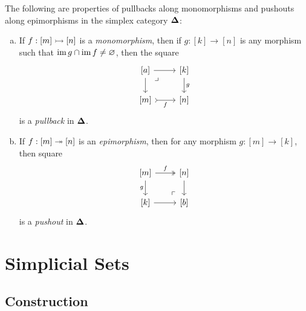 \begin{lemma}
\label{lem:splx-cat-pullback-mono-pushout-epi}
The following are properties of pullbacks along monomorphisms and pushouts along
epimorphisms in the simplex category \({\mathbf{\Delta}}\):
\begin{enumerate}[(a)]\setlength\itemsep{0em}
\item If \(f: [m] \rightarrowtail [n]\) is a \emph{monomorphism}, then if \(g: [k] \to
  [n]\) is any morphism such that \(\operatorname{im} g \cap \operatorname{im} f \neq \varnothing\), then the
  square
  \[
  \begin{tikzcd}
  {[a]}  \ar[r] \ar[d] \ar[rd, phantom, very near start, "\lrcorner"]
  &{[k]} \ar[d, "g"] \\
  {[m]} \ar[r, tail, "f"'] &{[n]}
  \end{tikzcd}
  \]
  is a \emph{pullback} in \({\mathbf{\Delta}}\).
\item If \(f: [m] \twoheadrightarrow [n]\) is an \emph{epimorphism}, then for any morphism
  \(g: [m] \to [k]\), then square
  \[
  \begin{tikzcd}
  {[m]} \ar[r, two heads, "f"] \ar[d, "g"']
  \ar[dr, very near end, phantom, "\ulcorner"]
  &{[n]} \ar[d] \\
  {[k]} \ar[r] &{[b]}
  \end{tikzcd}
  \]
  is a \emph{pushout} in \({\mathbf{\Delta}}\).
\end{enumerate}
\end{lemma}



\section{Simplicial Sets}

\subsection{Construction}

